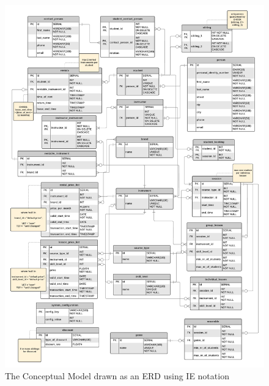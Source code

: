 \documentclass[a4paper]{scrartcl}
\begin{document}


\begin{figure}[h!]
  \begin{center}
    \includegraphics[width=\textwidth]{../figures/logi_phys.png}
    \caption{The Conceptual Model drawn as an ERD using IE notation}
    \label{fig:cm}
  \end{center}
\end{figure}
\end{document}
